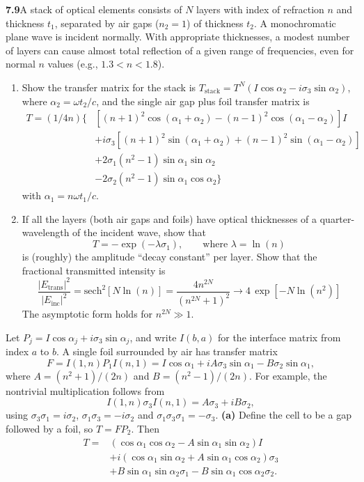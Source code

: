 \par\bigskip
\noindent\textbf{7.9}\quad A stack of optical elements consists of $N$ layers with index of refraction $n$ and thickness $t_{1}$, separated by air gaps ($n_{2}=1$) of thickness $t_{2}$. A monochromatic plane wave is incident normally. With appropriate thicknesses, a modest number of layers can cause almost total reflection of a given range of frequencies, even for normal $n$ values (e.g., $1.3<n<1.8$).
\begin{enumerate}
\item[(a)] Show the transfer matrix for the stack is $T_{\mathrm{stack}}=T^{N}(I\cos\alpha_{2}-i\sigma_{3}\sin\alpha_{2})$, where $\alpha_{2}=\omega t_{2}/c$, and the single air gap plus foil transfer matrix is
\begin{align*}
T=(1/4n)\{&[(n+1)^{2}\cos(\alpha_{1}+\alpha_{2})-(n-1)^{2}\cos(\alpha_{1}-\alpha_{2})]I\\
&+i\sigma_{3}[(n+1)^{2}\sin(\alpha_{1}+\alpha_{2})+(n-1)^{2}\sin(\alpha_{1}-\alpha_{2})]\\
&+2\sigma_{1}(n^{2}-1)\sin\alpha_{1}\sin\alpha_{2}\\
&-2\sigma_{2}(n^{2}-1)\sin\alpha_{1}\cos\alpha_{2}\}
\end{align*}
with $\alpha_{1}=n\omega t_{1}/c$.
\item[(b)] If all the layers (both air gaps and foils) have optical thicknesses of a quarter-wavelength of the incident wave, show that
\[
T=-\exp(-\lambda\sigma_{1}),\qquad\text{where }\lambda=\ln(n)
\]
is (roughly) the amplitude ``decay constant'' per layer. Show that the fractional transmitted intensity is
\[
\frac{|E_{\mathrm{trans}}|^{2}}{|E_{\mathrm{inc}}|^{2}}=\mathrm{sech}^{2}[N\ln(n)]=\frac{4n^{2N}}{(n^{2N}+1)^{2}}\to 4\,\exp[-N\ln(n^{2})]
\]
The asymptotic form holds for $n^{2N}\gg1$.
\end{enumerate}
\solution
Let $P_j=I\cos\alpha_j+i\sigma_3\sin\alpha_j$, and write
$I(b,a)$ for the interface matrix from index $a$ to $b$.
A single foil surrounded by air has transfer matrix
\[
F=I(1,n)P_1I(n,1)
=I\cos\alpha_1+iA\sigma_3\sin\alpha_1-B\sigma_2\sin\alpha_1,
\]
where $A=(n^2+1)/(2n)$ and $B=(n^2-1)/(2n)$.
For example, the nontrivial multiplication follows from
\[
I(1,n)\sigma_3I(n,1)=A\sigma_3+iB\sigma_2,
\]
using $\sigma_3\sigma_1=i\sigma_2$,
$\sigma_1\sigma_3=-i\sigma_2$ and
$\sigma_1\sigma_3\sigma_1=-\sigma_3$.
\textbf{(a)} Define the cell to be a gap followed by a foil, so
$T=FP_2$. Then
\[
\begin{aligned}
T={}&(\cos\alpha_1\cos\alpha_2-A\sin\alpha_1\sin\alpha_2)I\\
&+i(\cos\alpha_1\sin\alpha_2+A\sin\alpha_1\cos\alpha_2)\sigma_3\\
&+B\sin\alpha_1\sin\alpha_2\sigma_1
 -B\sin\alpha_1\cos\alpha_2\sigma_2.
\end{aligned}
\]
